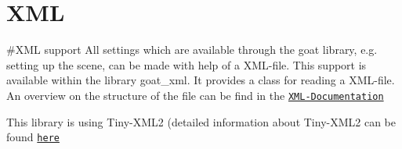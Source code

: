 \chapter{XML }
\hypertarget{md__x_m_l}{}\label{md__x_m_l}
\#\+XML support All settings which are available through the goat library, e.\+g. setting up the scene, can be made with help of a XML-\/file. This support is available within the library goat\+\_\+xml. It provides a class  for reading a XML-\/file. An overview on the structure of the file can be find in the \href{../../latex/xmldoc.pdf}{\texttt{XML-\/\+Documentation}} ~\newline


This library is using Tiny-\/\+XML2 (detailed information about Tiny-\/\+XML2 can be found \href{https://github.com/leethomason/tinyxml2}{\texttt{here}} 